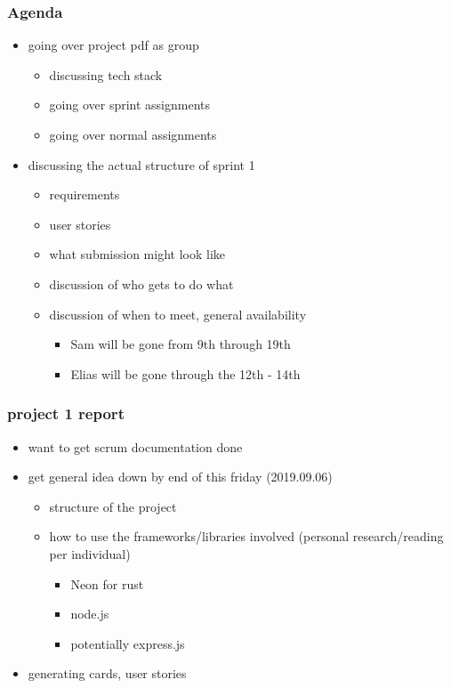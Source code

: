 \documentclass[11pt]{article}
\begin{document}
\subsubsection*{Agenda}
\label{sec:org7ca0c95}
\begin{itemize}
\item going over project pdf as group
\begin{itemize}
\item discussing tech stack
\item going over sprint assignments
\item going over normal assignments
\end{itemize}
\item discussing the actual structure of sprint 1
\begin{itemize}
\item requirements
\item user stories
\item what submission might look like
\item discussion of who gets to do what
\item discussion of when to meet, general availability
\begin{itemize}
\item Sam will be gone from 9th through 19th
\item Elias will be gone through the 12th - 14th
\end{itemize}
\end{itemize}
\end{itemize}
\subsubsection*{project 1 report}
\label{sec:org801685e}
\begin{itemize}
\item want to get scrum documentation done
\item get general idea down by end of this friday (2019.09.06)
\begin{itemize}
\item structure of the project
\item how to use the frameworks/libraries involved (personal research/reading
per individual)
\begin{itemize}
\item Neon for rust
\item node.js
\item potentially express.js
\end{itemize}
\end{itemize}
\item generating cards, user stories
\end{itemize}
\end{document}
